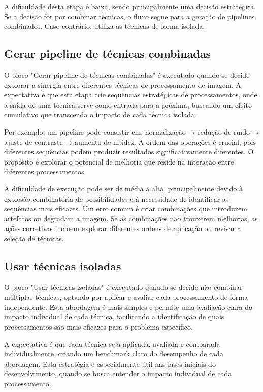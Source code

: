 A dificuldade desta etapa é baixa, sendo principalmente uma decisão estratégica. Se a decisão for por combinar técnicas, o fluxo segue para a geração de pipelines combinados. Caso contrário, utiliza as técnicas de forma isolada.

\subsection{Gerar pipeline de técnicas combinadas}
O bloco "Gerar pipeline de técnicas combinadas" é executado quando se decide explorar a sinergia entre diferentes técnicas de processamento de imagem. A expectativa é que esta etapa crie sequências estratégicas de processamentos, onde a saída de uma técnica serve como entrada para a próxima, buscando um efeito cumulativo que transcenda o impacto de cada técnica isolada.

Por exemplo, um pipeline pode consistir em: normalização → redução de ruído → ajuste de contraste → aumento de nitidez. A ordem das operações é crucial, pois diferentes sequências podem produzir resultados significativamente diferentes. O propósito é explorar o potencial de melhoria que reside na interação entre diferentes processamentos.

A dificuldade de execução pode ser de média a alta, principalmente devido à explosão combinatória de possibilidades e à necessidade de identificar as sequências mais eficazes. Um erro comum é criar combinações que introduzem artefatos ou degradam a imagem. Se as combinações não trouxerem melhorias, as ações corretivas incluem explorar diferentes ordens de aplicação ou revisar a seleção de técnicas.

\subsection{Usar técnicas isoladas}
O bloco "Usar técnicas isoladas" é executado quando se decide não combinar múltiplas técnicas, optando por aplicar e avaliar cada processamento de forma independente. Esta abordagem é mais simples e permite uma avaliação clara do impacto individual de cada técnica, facilitando a identificação de quais processamentos são mais eficazes para o problema específico.

A expectativa é que cada técnica seja aplicada, avaliada e comparada individualmente, criando um benchmark claro do desempenho de cada abordagem. Esta estratégia é especialmente útil nas fases iniciais do desenvolvimento, quando se busca entender o impacto individual de cada processamento.

